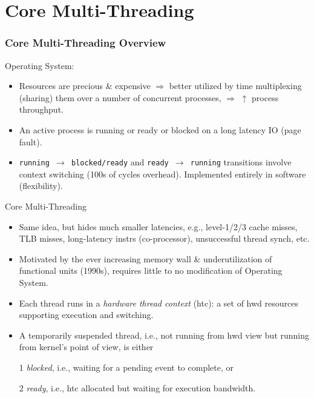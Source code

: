 \documentclass{beamer}
\newcommand{\emp}[1]{\textcolor{DikuRed}{ #1}}
\begin{document}

\section{Core Multi-Threading}

\begin{frame}[fragile]
	\tableofcontents[currentsection]
\end{frame}

\begin{frame}[fragile,t]
\frametitle{Core Multi-Threading Overview}

\begin{scriptsize}
Operating System:
\begin{itemize}
\item Resources are precious \& expensive $\Rightarrow$ 
            better utilized by time multiplexing (sharing) them over a 
            number of concurrent processes, 
            $\Rightarrow$ $\uparrow$ process throughput.\smallskip
\item An active process is \emp{running or ready or blocked} 
            on a long latency IO (page fault).\smallskip
\item {\tt running $\rightarrow$ blocked/ready} and 
      {\tt ready $\rightarrow$ running} transitions
        involve context switching (100s of cycles overhead).
        Implemented entirely in software (flexibility).
\end{itemize}

\bigskip

Core Multi-Threading
\begin{itemize}
\item Same idea, but hides much smaller latencies,
        e.g., level-1/2/3 cache misses, TLB misses, long-latency instrs
                (co-processor), unsuccessful thread synch, etc.\smallskip

\item Motivated by the ever increasing memory wall \& underutilization of 
        functional units (1990s), requires little to no modification of Operating System.

\item Each thread runs in a \emp{\em hardware thread context} ({\sc htc}): 
        a set of hwd resources supporting execution and switching.

\item A temporarily suspended thread, i.e., not \emp{running} from hwd view but running 
            from kernel's point of view, is either 
\item[1] \emp{\em blocked}, i.e., waiting for a pending event to complete, or
\item[2] \emp{\em ready}, i.e., {\sc htc} allocated but waiting for execution bandwidth.
\end{itemize} 
\end{scriptsize}

\end{frame}
\end{document}

